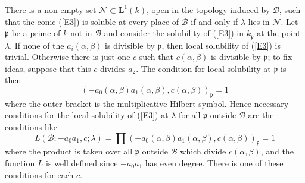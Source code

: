 \documentclass[12pt]{article}
\def\bL{{\mathbf L}}
\def\fp{{\mathfrak p}}
\def\ga{{\alpha}}
\def\gb{{\beta}}
\def\gl{{\lambda}}
\def\sB{{\mathcal B}}
\def\sN{{\mathcal N}}
\def\beq{\begin{equation} \label}
\begin{document}
There is a non-empty set $\sN\subset\bL^1(k)$, open in
the topology induced by $\sB$, such that the conic (\ref{E3}) is soluble at
every place of $\sB$ if and only if $\gl$ lies in $\sN$. Let $\fp$ be a prime
of $k$ not in $\sB$ and consider the solubility of (\ref{E3}) in $k_\fp$ at
the point $\gl$. If none of
the $a_i(\ga,\gb)$ is divisible by $\fp$, then local solubility of (\ref{E3})
is trivial. Otherwise there is just one $c$ such
that $c(\ga,\gb)$ is divisible by $\fp$; to fix ideas,
suppose that this $c$ divides $a_2$. The condition for local
solubility at $\fp$ is then
\beq{E4} (-a_0(\ga,\gb)a_1(\ga,\gb),c(\ga,\gb))_\fp=1 \end{equation}
where the outer bracket is the multiplicative Hilbert symbol. Hence necessary
conditions for the local solubility of (\ref{E3}) at $\gl$ for all $\fp$
outside $\sB$ are the conditions like
\beq{E9} L(\sB;-a_0a_1,c;\gl)=\prod(-a_0(\ga,\gb)a_1(\ga,\gb),c(\ga,\gb))_\fp
=1 \end{equation}
where the product is taken over all $\fp$ outside $\sB$ which divide $c(\ga,
\gb)$, and the function $L$ is well defined since $-a_0a_1$ has even
degree. There is one of these conditions for each $c$.
\end{document}
